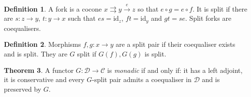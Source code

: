 \documentclass[a4paper,10pt]{article}
\theoremstyle{definition}
\newtheorem{theorem}{Theorem}
\newtheorem{definition}[theorem]{Definition}
\newcommand{\C}{\mathcal{C}}
\newcommand{\D}{\mathcal{D}}
\newcommand{\id}{\mathrm{id}}
\begin{document}
\begin{definition}
    A fork is a cocone $x \rightrightarrows y  \xrightarrow{e} z $ so that $e \circ g = e \circ f$. It is split if there are $s \colon z \rightarrow y$, $t \colon y \rightarrow x$ such that $es = \id_z$, $ft = \id_y$ and $gt = se$.
    Split forks are coequalisers.
\end{definition}

\begin{definition}
    Morphisms $f, g \colon x \rightarrow y$ are a split pair if their coequaliser exists and is split. They are $G$ split if $G(f), G(g)$ is split.
\end{definition}

\begin{theorem}
    A functor $G \colon \D \rightarrow \C$ is \emph{monadic} if and only if: it has a left adjoint, it is conservative and every $G$-split pair admits a coequaliser in $\D$ and is preserved by $G$.
\end{theorem}
\end{document}

